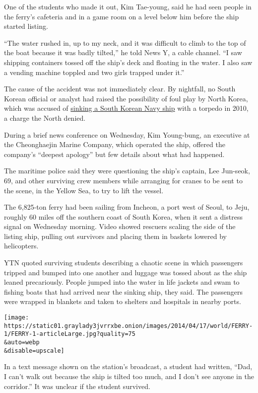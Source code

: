 One of the students who made it out, Kim Tae-young, said he had seen
people in the ferry's cafeteria and in a game room on a level below him
before the ship started listing.

``The water rushed in, up to my neck, and it was difficult to climb to
the top of the boat because it was badly tilted,'' he told News Y, a
cable channel. ``I saw shipping containers tossed off the ship's deck
and floating in the water. I also saw a vending machine toppled and two
girls trapped under it.''

The cause of the accident was not immediately clear. By nightfall, no
South Korean official or analyst had raised the possibility of foul play
by North Korea, which was accused of
\href{http://www.nytimes3xbfgragh.onion/2010/03/27/world/asia/27korea.html}{sinking
a South Korean Navy ship} with a torpedo in 2010, a charge the North
denied.

During a brief news conference on Wednesday, Kim Young-bung, an
executive at the Cheonghaejin Marine Company, which operated the ship,
offered the company's ``deepest apology'' but few details about what had
happened.

The maritime police said they were questioning the ship's captain, Lee
Jun-seok, 69, and other surviving crew members while arranging for
cranes to be sent to the scene, in the Yellow Sea, to try to lift the
vessel.

The 6,825-ton ferry had been sailing from Incheon, a port west of Seoul,
to Jeju, roughly 60 miles off the southern coast of South Korea, when it
sent a distress signal on Wednesday morning. Video showed rescuers
scaling the side of the listing ship, pulling out survivors and placing
them in baskets lowered by helicopters.

YTN quoted surviving students describing a chaotic scene in which
passengers tripped and bumped into one another and luggage was tossed
about as the ship leaned precariously. People jumped into the water in
life jackets and swam to fishing boats that had arrived near the sinking
ship, they said. The passengers were wrapped in blankets and taken to
shelters and hospitals in nearby ports.

\texttt{[image: https://static01.graylady3jvrrxbe.onion/images/2014/04/17/world/FERRY-1/FERRY-1-articleLarge.jpg?quality=75\\\&auto=webp\\\&disable=upscale]}

In a text message shown on the station's broadcast, a student had
written, ``Dad, I can't walk out because the ship is tilted too much,
and I don't see anyone in the corridor.'' It was unclear if the student
survived.

